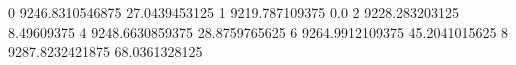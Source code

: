0 9246.8310546875 27.0439453125
1 9219.787109375 0.0
2 9228.283203125 8.49609375
4 9248.6630859375 28.8759765625
6 9264.9912109375 45.2041015625
8 9287.8232421875 68.0361328125
